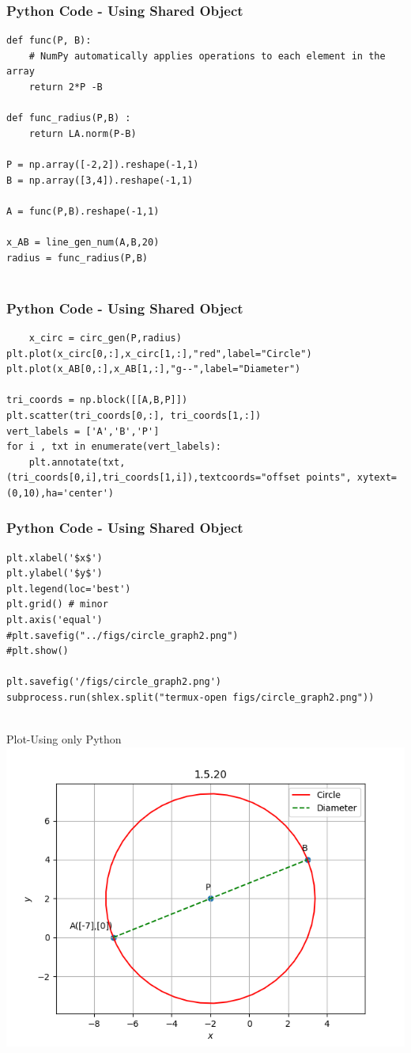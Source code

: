 \documentclass{beamer}
\begin{document}
\begin{frame}[fragile]
    \frametitle{Python Code - Using Shared Object}
    \begin{lstlisting}
def func(P, B):
    # NumPy automatically applies operations to each element in the array
    return 2*P -B

def func_radius(P,B) :
    return LA.norm(P-B)

P = np.array([-2,2]).reshape(-1,1)
B = np.array([3,4]).reshape(-1,1)

A = func(P,B).reshape(-1,1)

x_AB = line_gen_num(A,B,20)
radius = func_radius(P,B)


\end{lstlisting}
\end{frame}

\begin{frame}[fragile]
    \frametitle{Python Code - Using Shared Object}
    \begin{lstlisting}
    x_circ = circ_gen(P,radius)
plt.plot(x_circ[0,:],x_circ[1,:],"red",label="Circle")
plt.plot(x_AB[0,:],x_AB[1,:],"g--",label="Diameter")

tri_coords = np.block([[A,B,P]])
plt.scatter(tri_coords[0,:], tri_coords[1,:])
vert_labels = ['A','B','P']
for i , txt in enumerate(vert_labels):
    plt.annotate(txt,(tri_coords[0,i],tri_coords[1,i]),textcoords="offset points", xytext=(0,10),ha='center')
\end{lstlisting}
\end{frame}

\begin{frame}[fragile]
    \frametitle{Python Code - Using Shared Object}
    \begin{lstlisting}
plt.xlabel('$x$')
plt.ylabel('$y$')
plt.legend(loc='best')
plt.grid() # minor
plt.axis('equal')
#plt.savefig("../figs/circle_graph2.png")
#plt.show()

plt.savefig('/figs/circle_graph2.png')
subprocess.run(shlex.split("termux-open figs/circle_graph2.png"))


    \end{lstlisting}
\end{frame}


\begin{frame}{Plot-Using only Python}
    \centering
    \includegraphics[width=\columnwidth, height=0.8\textheight, keepaspectratio]{figs/circle_graph2.png}     
\end{frame}
\end{document}
